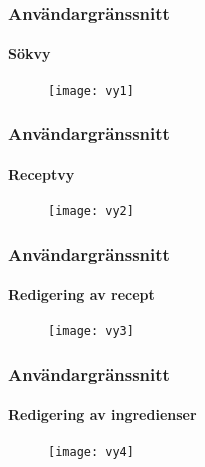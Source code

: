 \begin{frame}
  \frametitle{Användargränssnitt}
  \framesubtitle{Sökvy}
  \begin{figure}
    \texttt{[image: vy1]}
  \end{figure}
\end{frame}

\begin{frame}
  \frametitle{Användargränssnitt}
  \framesubtitle{Receptvy}
  \begin{figure}
    \texttt{[image: vy2]}
  \end{figure}
\end{frame}

\begin{frame}
  \frametitle{Användargränssnitt}
  \framesubtitle{Redigering av recept}
  \begin{figure}
    \texttt{[image: vy3]}
  \end{figure}
\end{frame}

\begin{frame}
  \frametitle{Användargränssnitt}
  \framesubtitle{Redigering av ingredienser}
  \begin{figure}
    \texttt{[image: vy4]}
  \end{figure}
\end{frame}


